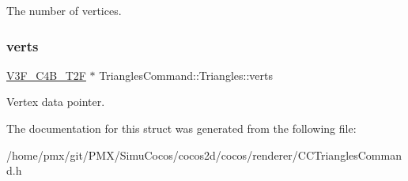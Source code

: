 The number of vertices. \mbox{\label{structTrianglesCommand_1_1Triangles_a38ec346029e58886359e2d598ed8bb07}} 
\subsubsection{\texorpdfstring{verts}{verts}}
{\footnotesize\ttfamily \hyperlink{structV3F__C4B__T2F}{V3\+F\+\_\+\+C4\+B\+\_\+\+T2F} $\ast$ Triangles\+Command\+::\+Triangles\+::verts}

Vertex data pointer. 

The documentation for this struct was generated from the following file\+:\begin{DoxyCompactItemize}
\item 
/home/pmx/git/\+P\+M\+X/\+Simu\+Cocos/cocos2d/cocos/renderer/C\+C\+Triangles\+Command.\+h\end{DoxyCompactItemize}
